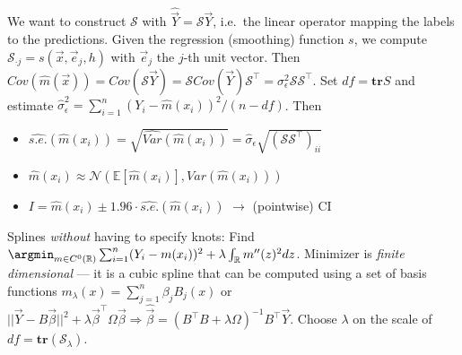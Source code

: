 \begin{sectionbox}\nospacing{}
  We want to construct $\mathcal{S}$ with $\hat{\vec{Y}} = \mathcal{S}\vec{Y}$, i.e.\ the linear operator mapping the labels to the predictions.
  Given the regression (smoothing) function $s$, we compute $\mathcal{S}_{\cdot j} = s(\vec{x}, \vec{e}_{j}, h)$ with $\vec{e}_{j}$ the $j$-th unit vector.
  Then $Cov(\hat m(\vec{x})) = Cov(\mathcal{S} \vec{Y}) = \mathcal{S} Cov(\vec{Y}) \mathcal{S}^{\top} = \sigma_{\epsilon}^{2}\mathcal{S}\mathcal{S}^{\top}$. Set $df=\mathbf{tr}S$ and 
  estimate $\hat{\sigma}_{\epsilon}^{2} = \sum_{i=1}^{n}{(Y_{i} - \hat m(x_{i}))}^{2}/(n-df)$.
  Then
  \begin{itemize}
    \item $\widehat{s.e.}(\hat m(x_{i})) = \sqrt{\widehat{Var}(\hat m(x_{i}))} = \hat \sigma_{\epsilon} \sqrt{{(\mathcal{S}\mathcal{S}^{\top})}_{ii}}$
    \item $\hat m(x_{i}) \approx \mathcal{N}\left(\mathbb{E}[\hat m(x_{i})], Var(\hat m(x_{i}))\right)$
    \item $I = \hat m(x_{i}) \pm 1.96 \cdot \widehat{s.e.}(\hat m(x_{i}))$ $\rightarrow$ (pointwise) CI
  \end{itemize}
\end{sectionbox}

\begin{sectionbox}\nospacing{}
 Splines \emph{without} having to specify knots:
  Find $\argmin_{m \in C^{0}(\mathbb{R})} \sum_{i=1}^{n}(Y_{i} - m(x_{i}))^{2} + \lambda \int_{\mathbb{R}}m''(z)^{2} dz$.
  Minimizer is \emph{finite dimensional} --- it is a cubic spline that can be computed using a set of basis functions $m_{\lambda}(x) = \sum_{j=1}^{n}\beta_{j}B_{j}(x)$ or $||\vec{Y} - B\vec{\beta}||^{2}+\lambda \vec{\beta}^{\top}\Omega\vec{\beta} \Rightarrow \hat{\vec{\beta}} = {(B^{\top}B + \lambda\Omega)}^{-1}B^{\top}\vec{Y}$.
  Choose $\lambda$ on the scale of $df = \mathbf{tr}(\mathcal{S}_{\lambda})$.
\end{sectionbox}
